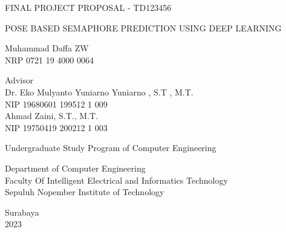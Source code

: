 \begin{large}
  FINAL PROJECT PROPOSAL - TD123456
\end{large}

\vspace{\fill}

\begin{spacing}{1.5}
  \begin{Large}
    POSE BASED SEMAPHORE PREDICTION USING DEEP LEARNING
  \end{Large}
\end{spacing}

\vspace{\fill}

\begin{large}
  Muhammad Daffa ZW \\
  \textnormal{NRP 0721 19 4000 0064}
\end{large}

\vspace{\fill}

\begin{large}
  \textnormal{Advisor} \\
  Dr. Eko Mulyanto Yuniarno Yuniarno , S.T , M.T. \\
  \textnormal{NIP 19680601 199512 1 009} \\
  Ahmad Zaini, S.T., M.T. \\
  \textnormal{NIP 19750419 200212 1 003}
\end{large}

\vspace{\fill}

Undergraduate Study Program of Computer Engineering \\

\normalfont

Department of Computer Engineering \\
Faculty Of Intelligent Electrical and Informatics Technology \\
Sepuluh Nopember Institute of Technology

Surabaya \\
2023
